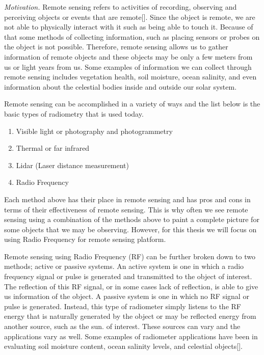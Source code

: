 \emph{Motivation.}  Remote sensing refers to activities of recording, observing and perceiving objects or events that are remote[\cite{weng2012}].  Since the object is remote, we are not able to physically interact with it such as being able to touch it.  Because of that some methods of collecting information, such as placing sensors or probes on the object is not possible.  Therefore, remote sensing allows us to gather information of remote objects and these objects may be only a few meters from us or light years from us.  Some examples of information we can collect through remote sensing includes vegetation health, soil moisture, ocean salinity, and even information about the celestial bodies inside and outside our solar system.  

Remote sensing can be accomplished in a variety of ways and the list below is the basic types of radiometry that is used today.

\begin{enumerate}
\item Visible light or photography and photogrammetry
\item Thermal or far infrared 
\item Lidar (Laser distance measurement)
\item Radio Frequency 
\end{enumerate}

Each method above has their place in remote sensing and has pros and cons in terms of their effectiveness of remote sensing.  This is why often we see remote sensing using a combination of the methods above to paint a complete picture for some objects that we may be observing.  However, for this thesis we will focus on using Radio Frequency for remote sensing platform.

Remote sensing using Radio Frequency (RF) can be further broken down to two methods; active or passive systems.  An active system is one in which a radio frequency signal or pulse is generated and transmitted to the object of interest.  The reflection of this RF signal, or in some cases lack of reflection, is able to give us information of the object.  A passive system is one in which no RF signal or pulse is generated.  Instead, this type of radiometer simply listens to the RF energy that is naturally generated by the object or may be reflected energy from another source, such as the sun. of interest.  These sources can vary and the applications vary as well.  Some examples of radiometer applications have been in evaluating soil moisture content, ocean salinity levels, and celestial objects[\cite{ulaby2014}].

